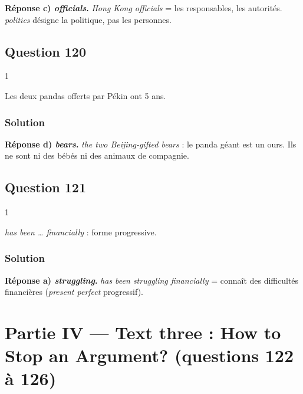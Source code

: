 \documentclass[11pt,a4paper]{article}
\begin{document}
\textbf{Réponse c) \emph{officials}.} \emph{Hong Kong officials} = les responsables, les autorités. \emph{politics} désigne la politique, pas les personnes.

\hypertarget{question-120}{%
\subsection{Question 120}\label{question-120}}

\begin{indication}{1}

Les deux pandas offerts par Pékin ont 5 ans.

\end{indication}

\hypertarget{solution-119}{%
\subsubsection{Solution}\label{solution-119}}

\textbf{Réponse d) \emph{bears}.} \emph{the two Beijing-gifted bears} : le panda géant est un ours. Ils ne sont ni des bébés ni des animaux de compagnie.

\hypertarget{question-121}{%
\subsection{Question 121}\label{question-121}}

\begin{indication}{1}

\emph{has been \ldots{} financially} : forme progressive.

\end{indication}

\hypertarget{solution-120}{%
\subsubsection{Solution}\label{solution-120}}

\textbf{Réponse a) \emph{struggling}.} \emph{has been struggling financially} = connaît des difficultés financières (\emph{present perfect} progressif).

\hypertarget{partie-iv-text-three-how-to-stop-an-argument-questions-122-uxe0-126}{%
\section{Partie IV --- Text three : How to Stop an Argument? (questions 122 à 126)}\label{partie-iv-text-three-how-to-stop-an-argument-questions-122-uxe0-126}}
\end{document}
